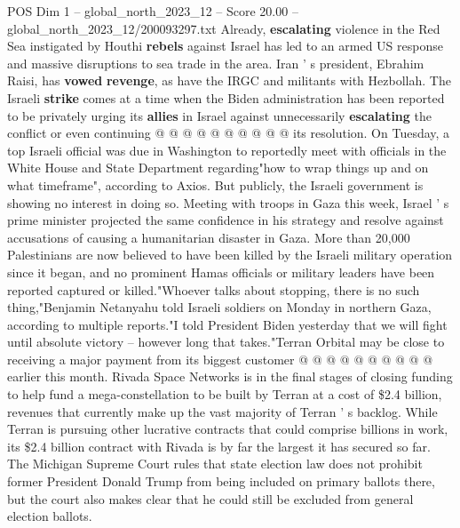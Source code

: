 \begin{textsample}{POS Dim 1 – global\_north\_2023\_12 – Score 20.00 – global\_north\_2023\_12/200093297.txt}
Already, \textbf{escalating} violence in the Red Sea instigated by Houthi \textbf{rebels} against Israel has led to an armed US response and massive disruptions to sea trade in the area.
Iran ' s president, Ebrahim Raisi, has \textbf{vowed} \textbf{revenge}, as have the IRGC and militants with Hezbollah.
The Israeli \textbf{strike} comes at a time when the Biden administration has been reported to be privately urging its \textbf{allies} in Israel against unnecessarily \textbf{escalating} the conflict or even continuing @ @ @ @ @ @ @ @ @ @ its resolution.
On Tuesday, a top Israeli official was due in Washington to reportedly meet with officials in the White House and State Department regarding"how to wrap things up and on what timeframe", according to Axios.
But publicly, the Israeli government is showing no interest in doing so.
Meeting with troops in Gaza this week, Israel ' s prime minister projected the same confidence in his strategy and resolve against accusations of causing a humanitarian disaster in Gaza.
More than 20,000 Palestinians are now believed to have been killed by the Israeli military operation since it began, and no prominent Hamas officials or military leaders have been reported captured or killed."Whoever talks about stopping, there is no such thing,"Benjamin Netanyahu told Israeli soldiers on Monday in northern Gaza, according to multiple reports."I told President Biden yesterday that we will fight until absolute victory -- however long that takes."Terran Orbital may be close to receiving a major payment from its biggest customer @ @ @ @ @ @ @ @ @ @ earlier this month.
Rivada Space Networks is in the final stages of closing funding to help fund a mega-constellation to be built by Terran at a cost of \$2.4 billion, revenues that currently make up the vast majority of Terran ' s backlog.
While Terran is pursuing other lucrative contracts that could comprise billions in work, its \$2.4 billion contract with Rivada is by far the largest it has secured so far.
The Michigan Supreme Court rules that state election law does not prohibit former President Donald Trump from being included on primary ballots there, but the court also makes clear that he could still be excluded from general election ballots.

\end{textsample}
